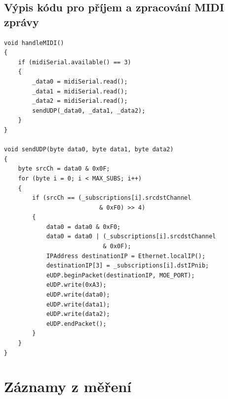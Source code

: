 \section{Výpis kódu pro příjem a zpracování \acs{MIDI} zprávy}\label{code:handleMIDI}
\begin{lstlisting}[caption=Výpis kódu pro příjem a zpracování MIDI zprávy]
void handleMIDI()
{
	if (midiSerial.available() == 3)
    {
        _data0 = midiSerial.read();
        _data1 = midiSerial.read();
        _data2 = midiSerial.read();
        sendUDP(_data0, _data1, _data2);
    }
}
	
void sendUDP(byte data0, byte data1, byte data2)
{
	byte srcCh = data0 & 0x0F;
	for (byte i = 0; i < MAX_SUBS; i++)
	{
		if (srcCh == (_subscriptions[i].srcdstChannel 
					       & 0xF0) >> 4)
		{
			data0 = data0 & 0xF0;
			data0 = data0 | (_subscriptions[i].srcdstChannel 
							& 0x0F);
			IPAddress destinationIP = Ethernet.localIP();
			destinationIP[3] = _subscriptions[i].dstIPnib;
			eUDP.beginPacket(destinationIP, MOE_PORT);
			eUDP.write(0xA3);
			eUDP.write(data0);
			eUDP.write(data1);
			eUDP.write(data2);
			eUDP.endPacket();
		}
	}
}
\end{lstlisting}

\chapter{Záznamy z měření}

